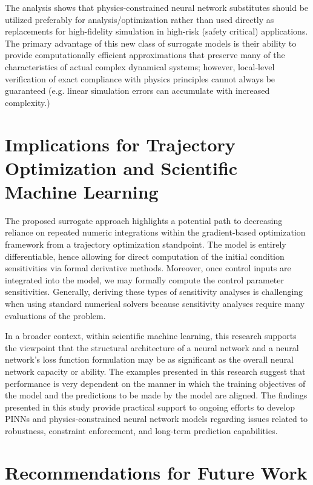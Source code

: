 The analysis shows that physics-constrained neural network substitutes should be utilized 
preferably for analysis/optimization rather than used directly as replacements for high-fidelity 
simulation in high-risk (safety critical) applications. The primary advantage of this new class 
of surrogate models is their ability to provide computationally efficient approximations that 
preserve many of the characteristics of actual complex dynamical systems; however, local-level 
verification of exact compliance with physics principles cannot always be guaranteed (e.g. linear 
simulation errors can accumulate with increased complexity.)

\section{Implications for Trajectory Optimization and Scientific Machine Learning}

The proposed surrogate approach highlights a potential path to decreasing reliance on repeated numeric 
integrations within the gradient-based optimization framework from a trajectory optimization standpoint. 
The model is entirely differentiable, hence allowing for direct computation of the initial condition sensitivities 
via formal derivative methods. Moreover, once control inputs are integrated into the model, we may formally 
compute the control parameter sensitivities. Generally, deriving these types of sensitivity analyses is 
challenging when using standard numerical solvers because sensitivity analyses require many evaluations of the problem.

In a broader context, within scientific machine learning, this research supports the viewpoint that the structural 
architecture of a neural network and a neural network’s loss function formulation may be as significant as the overall 
neural network capacity or ability. The examples presented in this research suggest that performance is very dependent on 
the manner in which the training objectives of the model and the predictions to be made by the model are aligned. The 
findings presented in this study provide practical support to ongoing efforts to develop PINNs and physics-constrained 
neural network models regarding issues related to robustness, constraint enforcement, and long-term prediction capabilities.

\section{Recommendations for Future Work}

